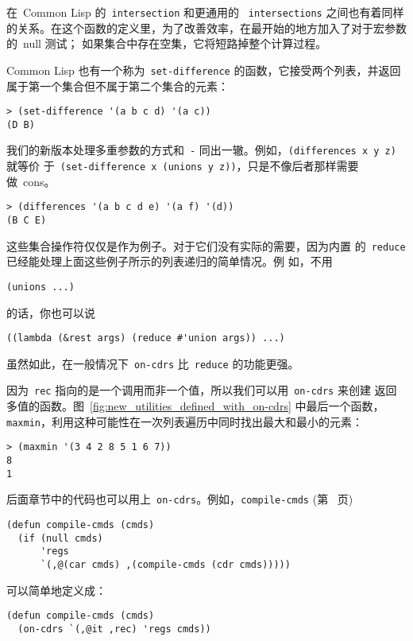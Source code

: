 在~Common Lisp 的~\texttt{intersection} 和更通用的
~\texttt{intersections} 之间也有着同样的关系。在这个函数的定义里，为了改善效率，在最开始的地方加入了对于宏参数的~null 测试；
如果集合中存在空集，它将短路掉整个计算过程。

Common Lisp 也有一个称为~\verb|set-difference| 的函数，它接受两个列表，并返回属于第一个集合但不属于第二个集合的元素：
\begin{lstlisting}
> (set-difference '(a b c d) '(a c))
(D B)
\end{lstlisting}

我们的新版本处理多重参数的方式和~\texttt{-} 同出一辙。例如，\texttt{(differences x y z)} 就等价
于~\texttt{(set-difference x (unions y z))}，只是不像后者那样需要做~cons。
\begin{lstlisting}
> (differences '(a b c d e) '(a f) '(d))
(B C E)
\end{lstlisting}

这些集合操作符仅仅是作为例子。对于它们没有实际的需要，因为内置
的~\texttt{reduce} 已经能处理上面这些例子所示的列表递归的简单情况。例
如，不用
\begin{lstlisting}
(unions ...)
\end{lstlisting}
的话，你也可以说
\begin{lstlisting}
((lambda (&rest args) (reduce #'union args)) ...)
\end{lstlisting}

虽然如此，在一般情况下~\verb|on-cdrs| 比~\verb|reduce| 的功能更强。

因为~\texttt{rec} 指向的是一个调用而非一个值，所以我们可以用~\texttt{on-cdrs} 来创建
返回多值的函数。图~\ref{fig:new_utilities_defined_with_on-cdrs} 中最后一个函数，
\texttt{maxmin}，利用这种可能性在一次列表遍历中同时找出最大和最小的元素：
\begin{lstlisting}
> (maxmin '(3 4 2 8 5 1 6 7))
8
1
\end{lstlisting}

后面章节中的代码也可以用上~\texttt{on-cdrs}。例如，\texttt{compile-cmds}
(第~\pageref{fig:compilation_of_nodes_and_arcs} 页)
\begin{lstlisting}
(defun compile-cmds (cmds)
  (if (null cmds)
      'regs
      `(,@(car cmds) ,(compile-cmds (cdr cmds)))))
\end{lstlisting}
可以简单地定义成：
\begin{lstlisting}
(defun compile-cmds (cmds)
  (on-cdrs `(,@it ,rec) 'regs cmds))
\end{lstlisting}

